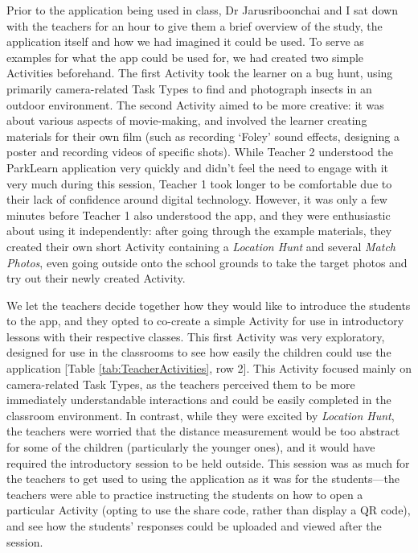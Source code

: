 Prior to the application being used in class, Dr Jarusriboonchai and I sat down with the teachers for an hour to give them a brief overview of the study, the application itself and how we had imagined it could be used. To serve as examples for what the app could be used for, we had created two simple Activities beforehand. The first Activity took the learner on a bug hunt, using primarily camera-related Task Types to find and photograph insects in an outdoor environment. The second Activity aimed to be more creative: it was about various aspects of movie-making, and involved the learner creating materials for their own film (such as recording `Foley' sound effects, designing a poster and recording videos of specific shots). While Teacher 2 understood the ParkLearn application very quickly and didn't feel the need to engage with it very much during this session, Teacher 1 took longer to be comfortable due to their lack of confidence around digital technology. However, it was only a few minutes before Teacher 1 also understood the app, and they were enthusiastic about using it independently: after going through the example materials, they created their own short Activity containing a \textit{Location Hunt} and several \textit{Match Photos}, even going outside onto the school grounds to take the target photos and try out their newly created Activity. 

We let the teachers decide together how they would like to introduce the students to the app, and they opted to co-create a simple Activity for use in introductory lessons with their respective classes. This first Activity was very exploratory, designed for use in the classrooms to see how easily the children could use the application [Table \ref{tab:TeacherActivities}, row 2]. This Activity focused mainly on camera-related Task Types, as the teachers perceived them to be more immediately understandable interactions and could be easily completed in the classroom environment. In contrast, while they were excited by \textit{Location Hunt}, the teachers were worried that the distance measurement would be too abstract for some of the children (particularly the younger ones), and it would have required the introductory session to be held outside. This session was as much for the teachers to get used to using the application as it was for the students---the teachers were able to practice instructing the students on how to open a particular Activity (opting to use the share code, rather than display a QR code), and see how the students' responses could be uploaded and viewed after the session.

